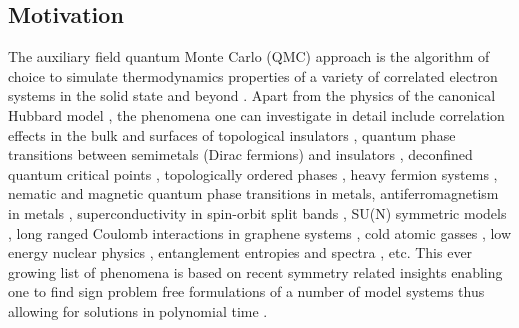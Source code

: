 
\subsection{Motivation}

The auxiliary field quantum Monte Carlo (QMC) approach is the algorithm of choice to simulate  thermodynamics properties of a variety of correlated electron systems in the solid state and beyond \cite{Blankenbecler81,White89,Sugiyama86,Sorella89, Duane87, Assaad08_rev}.  
Apart from the physics of the  canonical Hubbard model 
\cite{Scalapino07},   the phenomena  one can investigate in detail include correlation effects in the bulk and surfaces of topological insulators \cite{Hohenadler10,Zheng11}, quantum phase transitions between semimetals (Dirac fermions)  and insulators \cite{Assaad13,Toldin14,Otsuka16},  
deconfined quantum critical points \cite{Li15a,Assaad16}, topologically ordered phases \cite{Assaad16}, heavy fermion systems \cite{Assaad99a,Capponi00}, nematic \cite{Schattner15} and magnetic  \cite{Xu16b} quantum phase transitions in metals, antiferromagnetism in metals \cite{Berg12},    superconductivity in spin-orbit split bands \cite{Tang14_1}, SU(N) symmetric models \cite{Assaad04,Lang13},  long ranged Coulomb interactions in graphene systems \cite{Hohenadler14,Tang15},  cold atomic gasses  \cite{Rigol03},  low energy nuclear physics \cite{Lee09},  entanglement entropies and spectra \cite{Grover13,Broecker14,Assaad13a,Assaad15},  etc. 
This ever growing list of phenomena is based on  recent symmetry related insights enabling one to  find  sign problem  free formulations of a number of model systems thus allowing for solutions in polynomial time \cite{Wu04,Huffman14,Yao14a,Wei16}.  

